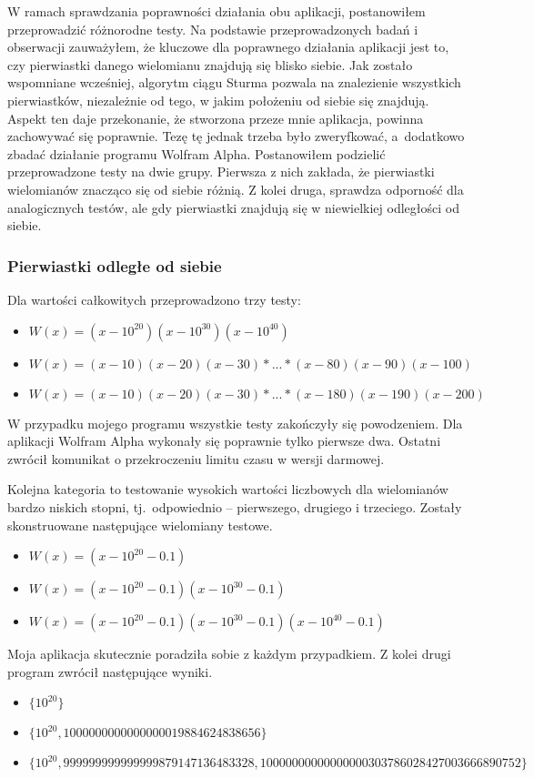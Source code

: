 W ramach sprawdzania poprawności działania obu aplikacji, postanowiłem przeprowadzić różnorodne testy. Na podstawie przeprowadzonych badań i obserwacji zauważyłem, że kluczowe dla poprawnego działania aplikacji jest to, czy pierwiastki danego wielomianu znajdują się blisko siebie. Jak zostało wspomniane wcześniej, algorytm ciągu Sturma pozwala na znalezienie wszystkich pierwiastków, niezależnie od tego, w jakim położeniu od siebie się znajdują. Aspekt ten daje przekonanie, że stworzona przeze mnie aplikacja, powinna zachowywać się poprawnie. Tezę tę jednak trzeba było zweryfkować, a~dodatkowo zbadać działanie programu Wolfram Alpha. Postanowiłem podzielić przeprowadzone testy na dwie grupy. Pierwsza z nich zakłada, że pierwiastki wielomianów znacząco się od siebie różnią. Z kolei druga, sprawdza odporność dla analogicznych testów, ale gdy pierwiastki znajdują się w niewielkiej odległości od siebie.

\subsubsection {Pierwiastki odległe od siebie}

Dla wartości całkowitych przeprowadzono trzy testy:
\begin{itemize}
	\item $W(x)=(x-10^{20})(x-10^{30})(x-10^{40})$
	\item $W(x)=(x-10)(x-20)(x-30)*...*(x-80)(x-90)(x-100)$
	\item $W(x)=(x-10)(x-20)(x-30)*...*(x-180)(x-190)(x-200)$
\end{itemize}

W przypadku mojego programu wszystkie testy zakończyły się powodzeniem. Dla aplikacji Wolfram Alpha wykonały się poprawnie tylko pierwsze dwa. Ostatni zwrócił komunikat o przekroczeniu limitu czasu w wersji darmowej.

Kolejna kategoria to testowanie wysokich wartości liczbowych dla wielomianów bardzo niskich stopni, tj.\ odpowiednio -- pierwszego, drugiego i trzeciego. Zostały skonstruowane następujące wielomiany testowe.
\begin{itemize}
	\item $W(x)=(x-10^{20}-0.1)$
	\item $W(x)=(x-10^{20}-0.1)(x-10^{30}-0.1)$
	\item $W(x)=(x-10^{20}-0.1)(x-10^{30}-0.1)(x-10^{40}-0.1)$
\end{itemize}

Moja aplikacja skutecznie poradziła sobie z każdym przypadkiem. Z kolei drugi program zwrócił następujące wyniki.
\begin{itemize}
	\item $\{10^{20}\}$
	\item $\{10^{20}, 1000000000000000019884624838656\}$
	\item $\{10^{20}, 999999999999999879147136483328, 10000000000000000303786028427003666890752\}$
\end{itemize}

